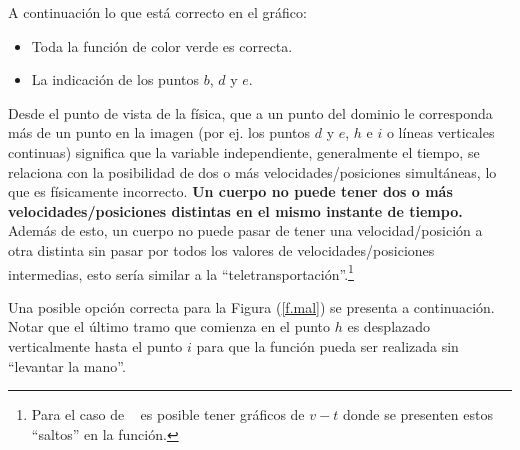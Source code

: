 

A continuación lo que está correcto en el gráfico:
\begin{itemize}
  \item Toda la función de color verde es correcta.
  \item La indicación de los puntos $b$, $d$ y $e$.
\end{itemize}

Desde el punto de vista de la física, que a un punto del dominio le corresponda
más de un punto en la imagen (por ej. los puntos $d$ y $e$, $h$ e $i$
o líneas verticales continuas) significa que la variable independiente,
generalmente el tiempo, se relaciona con la posibilidad de dos o más
velocidades/posiciones simultáneas, lo que es físicamente incorrecto. {\bf Un
cuerpo no puede tener dos o más velocidades/posiciones distintas en el mismo
instante de tiempo.} Además de esto, un cuerpo no puede pasar de tener una
velocidad/posición a otra distinta sin pasar por todos los valores de 
velocidades/posiciones intermedias, esto sería similar a la
``teletransportación''.\footnote{Para el caso de \mru~ es posible tener gráficos
de $v-t$ donde se presenten estos ``saltos'' en la función.}

Una posible opción correcta para la Figura (\ref{f.mal}) se presenta a
continuación. Notar que el último tramo que comienza en el punto $h$ es
desplazado verticalmente hasta el punto $i$ para que la función pueda ser
realizada sin ``levantar la mano''.







